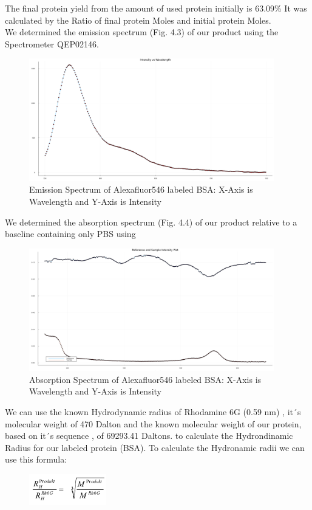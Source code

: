 \documentclass[a4paper,english,12pt,bibliography=totoc]{scrreprt}
\begin{document}
The final protein yield from the amount of used protein initially is 63.09\%
It was calculated by the Ratio of final protein Moles and initial protein Moles.
\\
We determined the emission spectrum (Fig. 4.3) of our product using the Spectrometer QEP02146.
\begin{figure}[H]
    \centering
    \includegraphics[width=0.95\textwidth]{emission.png}
    \caption{Emission Spectrum of Alexafluor546 labeled BSA: X-Axis is Wavelength and Y-Axis is Intensity}
    \label{fig:ViolinPlot}
\end{figure}

We determined the absorption spectrum (Fig. 4.4) of our product relative to a baseline containing only PBS using 

\begin{figure}[H]
    \centering
    \includegraphics[width=0.95\textwidth]{Absorption of Reference and Sample.png}
    \caption{Absorption Spectrum of Alexafluor546 labeled BSA: X-Axis is Wavelength and Y-Axis is Intensity}
    \label{fig:ViolinPlot}
\end{figure}

We can use the known Hydrodynamic radius of Rhodamine 6G (0.59 nm) , it´s molecular weight of 470 Dalton and the known molecular weight of our protein, based on it´s sequence , of 69293.41 Daltons.  to calculate the Hydrondinamic Radius for our labeled protein (BSA).
To calculate the Hydronamic radii  we can use this formula:
\begin{figure}[H]
    \centering
    \includegraphics[width=0.3\textwidth]{hydronimacradius.png}
    \label{fig:ViolinPlot}
\end{figure}
\end{document}
